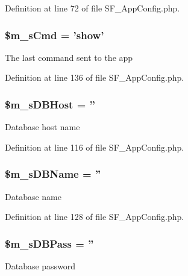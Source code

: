 Definition at line 72 of file SF\_\-AppConfig.php.

\hypertarget{classSF__AppConfig_a21ffd6ebc459ccba9514cbaee05b2ece}{
\subsubsection[{\$m\_\-sCmd}]{\setlength{\rightskip}{0pt plus 5cm}\$m\_\-sCmd = 'show'}}
\label{classSF__AppConfig_a21ffd6ebc459ccba9514cbaee05b2ece}
The last command sent to the app 

Definition at line 136 of file SF\_\-AppConfig.php.

\hypertarget{classSF__AppConfig_a57f2837146ff87e7fbf582f9012f809c}{
\subsubsection[{\$m\_\-sDBHost}]{\setlength{\rightskip}{0pt plus 5cm}\$m\_\-sDBHost = ''}}
\label{classSF__AppConfig_a57f2837146ff87e7fbf582f9012f809c}
Database host name 

Definition at line 116 of file SF\_\-AppConfig.php.

\hypertarget{classSF__AppConfig_a5989931373bd88e9cf65e47392df159f}{
\subsubsection[{\$m\_\-sDBName}]{\setlength{\rightskip}{0pt plus 5cm}\$m\_\-sDBName = ''}}
\label{classSF__AppConfig_a5989931373bd88e9cf65e47392df159f}
Database name 

Definition at line 128 of file SF\_\-AppConfig.php.

\hypertarget{classSF__AppConfig_a69fda4b78906e9f8f515ff44e4beca5c}{
\subsubsection[{\$m\_\-sDBPass}]{\setlength{\rightskip}{0pt plus 5cm}\$m\_\-sDBPass = ''}}
\label{classSF__AppConfig_a69fda4b78906e9f8f515ff44e4beca5c}
Database password 

